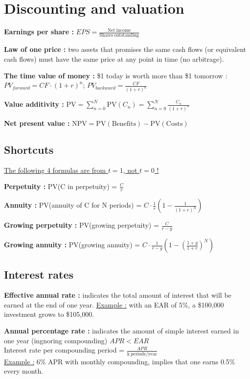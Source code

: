 \documentclass[a4paper,twocolumn]{article}
\newcommand{\PV} {\mathrm{PV}}
\newcommand{\NPV} {\mathrm{NPV}}
\begin{document}
\section*{Discounting and valuation}

\textbf{Earnings per share :} $EPS = \frac{\mathrm{Net\ income}}{\mathrm{Shares\ outstanding}} $

\textbf{Law of one price :} two assets that promises the same cash flows (or equivalent cash flows) must have the same price at any point in time (no arbitrage).

\textbf{The time value of money :} \$1 today is worth more than \$1 tomorrow : $PV_{forward} = CF \cdot (1+r)^n$; $PV_{backward} = \frac{CF}{(1+r)^n}$

\textbf{Value additivity :} $\PV = \sum_{n=0}^N \PV(C_n) = \sum_{n=0}^N \frac{C_n}{(1+r)^n}$

\textbf{Net present value :} $\NPV = \PV(\mathrm{Benefits}) - \PV(\mathrm{Costs})$

\subsection*{Shortcuts}

\underline{The following 4 formulas are from $t=1$, not $t=0$ !}

\textbf{Perpetuity :} PV(C in perpetuity) = $\frac{C}{r}$

\textbf{Annuity :} PV(annuity of C for N periods) = $C \cdot \frac{1}{r} \left( 1 - \frac{1}{(1+r)^N} \right)$

\textbf{Growing perpetuity :} PV(growing perpetuity) = $\frac{C}{r - g}$

\textbf{Growing annuity :} PV(growing annuity) = $C \cdot \frac{1}{r - g} \left( 1 - \left( \frac{1+g}{1+r}\right)^N \right)$

\subsection*{Interest rates}

\textbf{Effective annual rate :} indicates the total amount of interest that will be earned at the end of one year. \underline{Example :} with an EAR of 5\%, a \$100,000 investment grows to \$105,000.

\textbf{Annual percentage rate :} indicates the amount of simple interest earned in one year (ingnoring compounding)
$APR < EAR$\\
Interest rate per compounding period = $\frac{APR}{\mathrm{k\ periods / year}}$\\
\underline{Example :} 6\% APR with monthly compounding, implies that one earns 0.5\% every month.
\end{document}
